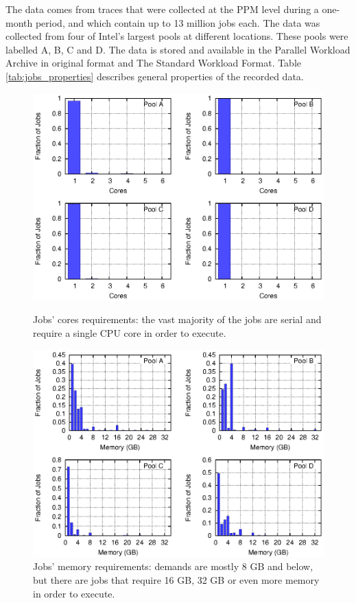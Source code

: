 The data comes from traces that were collected at the PPM
level during a one-month period, and which contain up to 13 million jobs each.
The data was collected from four of Intel's largest pools at different locations. 
These pools were labelled A, B, C and D.
The data is stored and available in the Parallel Workload Archive \cite{parallel13} in original format and The Standard Workload Format\cite{swf1}.
Table \ref{tab:jobs_properties} describes general properties of the recorded data.

\begin{figure}[p]\centering
	\includegraphics{figures/cores_multiplot.eps}
\caption{Jobs' cores requirements: the vast majority of the jobs are
  serial and require a single CPU core in order to execute.}
\label{fig:cores_usage_multiplot}
	\includegraphics{figures/memory_multiplot.eps}
\caption{Jobs' memory requirements: demands are mostly 8 GB and below,
  but there are jobs that require 16 GB, 32 GB or even more memory in
  order to execute.}
\label{fig:memory_usage_multiplot}
\end{figure}

